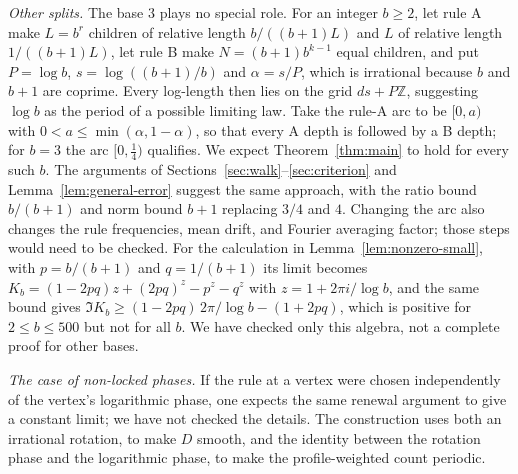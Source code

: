 \documentclass[11pt]{article}
\theoremstyle{definition}
\theoremstyle{remark}
\newcommand{\Z}{\mathbb Z}
\begin{document}
\emph{Other splits.} The base $3$ plays no special role. For an integer
$b\ge2$, let rule A make $L=b^r$ children of relative length
$b/((b+1)L)$ and $L$ of relative length $1/((b+1)L)$, let rule B make
$N=(b+1)b^{k-1}$ equal children, and put $P=\log b$,
$s=\log((b+1)/b)$ and $\alpha=s/P$, which is irrational because $b$ and
$b+1$ are coprime. Every log-length then lies on the grid $ds+P\Z$,
suggesting $\log b$ as the period of a possible limiting law.
Take the rule-A arc to be $[0,a)$ with
$0<a\le\min(\alpha,1-\alpha)$, so that every A depth is followed by a B
depth; for $b=3$ the arc $[0,\frac14)$ qualifies. We expect
Theorem~\ref{thm:main} to hold for every such $b$. The arguments of
Sections~\ref{sec:walk}--\ref{sec:criterion} and
Lemma~\ref{lem:general-error} suggest the same approach, with the
ratio bound $b/(b+1)$ and norm bound $b+1$ replacing $3/4$ and $4$.
Changing the arc also changes the rule frequencies, mean drift, and
Fourier averaging factor; those steps would need to be checked.
For the calculation in Lemma~\ref{lem:nonzero-small}, with
$p=b/(b+1)$ and $q=1/(b+1)$ its limit becomes
$K_b=(1-2pq)z+(2pq)^z-p^z-q^z$ with $z=1+2\pi i/\log b$, and the same
bound gives $\Im K_b\ge(1-2pq)\,2\pi/\log b-(1+2pq)$, which is positive
for $2\le b\le500$ but not for all $b$. We have checked only this
algebra, not a complete proof for other bases.

\emph{The case of non-locked phases.} If the rule at a vertex were chosen
independently of the vertex's logarithmic phase, one expects the same
renewal argument to give a constant limit; we have not checked the
details. The construction uses both an irrational
rotation, to make $D$ smooth, and the identity between the rotation phase
and the logarithmic phase, to make the profile-weighted count periodic.
\end{document}
